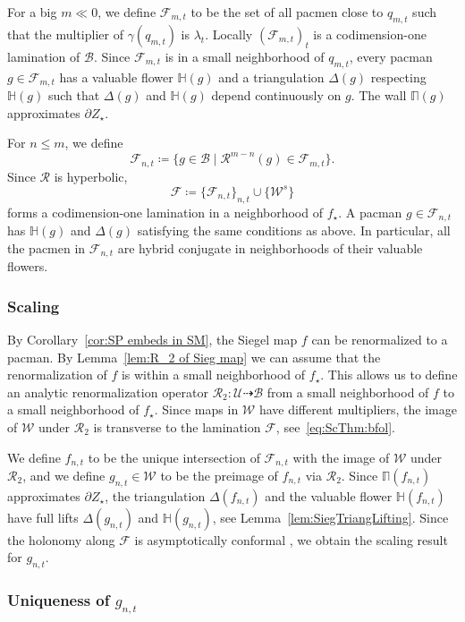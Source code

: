 \documentclass[]{amsart}
\newcommand{\bDelta}{{\mathbb{\Delta}}}
\newcommand{\bPi}{{\mathbb{\Pi}}}
\newcommand\RR{\mathcal{R}}
\newcommand{\fH}{{\mathbb H}}
\newcommand{\str}{{\star}}
\newcommand\WW{\mathcal{W}}
\newcommand\UU{\mathcal{U}}
\newcommand\BB{\mathcal{B}}
\newcommand{\Fol}{{\mathcal F}}
\newcommand{\bFol}{{\boldsymbol{ \mathcal F}}}
\theoremstyle{remark}
\numberwithin{equation}{section}
\theoremstyle{definition}
\begin{document}
For a big $m\ll 0$,  we define $\Fol_{m,t}$ to be the set of all pacmen close to $q_{m,t}$ such that the multiplier of $\gamma(q_{m,t})$ is $\lambda_t$. Locally $(\Fol_{m,t})_{t}$ is a codimension-one lamination of $\BB$. Since $\Fol_{m,t}$ is in a small neighborhood of $q_{m,t}$, every pacman $g\in\Fol_{m,t}$ has a valuable flower $\fH(g)$ and a triangulation $\bDelta (g) $ respecting $\fH(g)$ such that  $\bDelta (g) $ and $\fH(g)$ depend  continuously on $g$. The wall $\bPi (g) $ approximates $\partial Z_\str$.

For $n\le m$, we define
\[\Fol_{n,t}\coloneqq \{g\in \BB\mid \RR^{m-n}(g)\in \Fol_{m,t}\}.\] 
Since $\RR$ is hyperbolic,
 \begin{equation}
\label{eq:ScThm:bfol} 
\bFol\coloneqq \{\Fol_{n,t}\}_{n,t}\cup \{\WW^s\}
\end{equation} forms a codimension-one lamination in a neighborhood of $f_\str$. A pacman $g\in \Fol_{n,t}$ has $\fH(g)$  and $\bDelta (g) $ satisfying the same conditions as above. In particular, all the pacmen in $\Fol_{n,t}$ are hybrid conjugate in neighborhoods of their valuable flowers.  

\subsubsection{Scaling}
 By Corollary~\ref{cor:SP embeds in SM}, the Siegel map $f$ can be renormalized to a pacman. By Lemma~\ref{lem:R_2 of Sieg map} we can assume that the renormalization of $f$ is within a small neighborhood of $f_\str$. This allows us to define an analytic renormalization operator $\RR_2\colon\UU\dashrightarrow \BB$ from a small neighborhood of $f$ to a small neighborhood of $f_\str$. Since maps in $\WW$ have different multipliers, the image of $\WW$ under $\RR_2$ is transverse to the lamination $\bFol$, see~\eqref{eq:ScThm:bfol}. 
 
 We define $f_{n,t}$ to be the unique intersection of $\Fol_{n,t}$ with the image of $\WW$ under $\RR_2$, and we define $g_{n,t}\in \WW$ to be the preimage of $f_{n,t}$ via $\RR_2$. Since $\bPi(f_{n,t})$ approximates $\partial Z_\str$, the triangulation $\bDelta (f_{n,t})$ and the valuable flower $\fH(f_{n,t})$ have full lifts $\bDelta(g_{n,t})$ and $\fH(g_{n,t})$, see Lemma~\ref{lem:SiegTriangLifting}. Since the holonomy along $\bFol$ is asymptotically conformal \cite[Appendix 2, The $\lambda$-lemma (quasi- conformality)]{L:FCT}, we obtain the scaling result for $g_{n,t}$.
 \subsubsection{Uniqueness of $g_{n,t}$}
\end{document}
